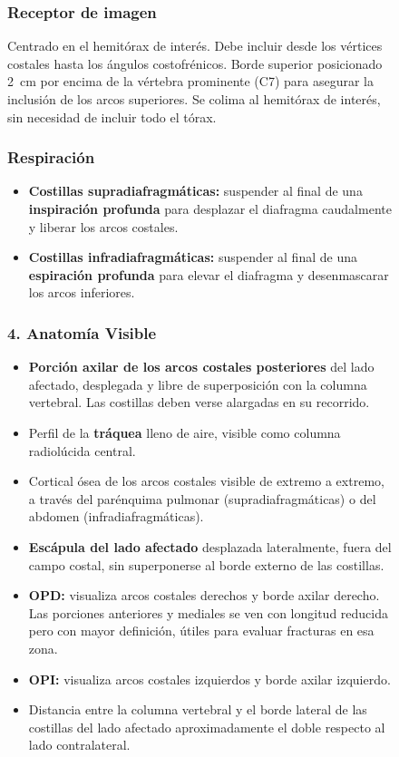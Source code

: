 \begin{figure}
{\subsubsection*{Receptor de imagen}
Centrado en el hemitórax de interés. Debe incluir desde los vértices costales hasta los ángulos costofrénicos. Borde superior posicionado 2~cm por encima de la vértebra prominente (C7) para asegurar la inclusión de los arcos superiores. Se colima al hemitórax de interés, sin necesidad de incluir todo el tórax.

\subsubsection*{Respiración}
\begin{itemize}
  \item \textbf{Costillas supradiafragmáticas:} suspender al final de una \textbf{inspiración profunda} para desplazar el diafragma caudalmente y liberar los arcos costales.
  \item \textbf{Costillas infradiafragmáticas:} suspender al final de una \textbf{espiración profunda} para elevar el diafragma y desenmascarar los arcos inferiores.
\end{itemize}

\subsubsection*{4. Anatomía Visible}

\begin{itemize}
  \item \textbf{Porción axilar de los arcos costales posteriores} del lado afectado, desplegada y libre de superposición con la columna vertebral. Las costillas deben verse alargadas en su recorrido.
  \item Perfil de la \textbf{tráquea} lleno de aire, visible como columna radiolúcida central.
  \item Cortical ósea de los arcos costales visible de extremo a extremo, a través del parénquima pulmonar (supradiafragmáticas) o del abdomen (infradiafragmáticas).
  \item \textbf{Escápula del lado afectado} desplazada lateralmente, fuera del campo costal, sin superponerse al borde externo de las costillas.
  \item \textbf{OPD:} visualiza arcos costales derechos y borde axilar derecho. Las porciones anteriores y mediales se ven con longitud reducida pero con mayor definición, útiles para evaluar fracturas en esa zona.
  \item \textbf{OPI:} visualiza arcos costales izquierdos y borde axilar izquierdo.
  \item Distancia entre la columna vertebral y el borde lateral de las costillas del lado afectado aproximadamente el doble respecto al lado contralateral.
\end{itemize}

}
\end{figure}
